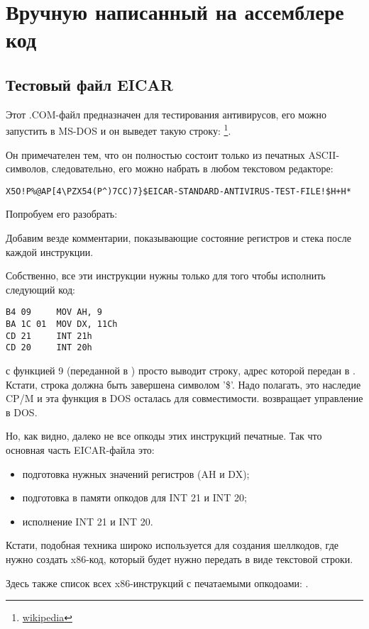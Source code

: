 \section{Вручную написанный на ассемблере код}

\subsection{Тестовый файл EICAR}
\label{subsec:EICAR}

Этот .COM-файл предназначен для тестирования антивирусов, его можно запустить в MS-DOS
и он выведет такую строку: 
\footnote{\href{http://go.yurichev.com/17005}{wikipedia}}.

Он примечателен тем, что он полностью состоит только из печатных ASCII-символов, следовательно, его можно
набрать в любом текстовом редакторе:

\begin{lstlisting}
X5O!P%@AP[4\PZX54(P^)7CC)7}$EICAR-STANDARD-ANTIVIRUS-TEST-FILE!$H+H*
\end{lstlisting}

Попробуем его разобрать:



Добавим везде комментарии, показывающие состояние регистров и стека после каждой инструкции.

Собственно, все эти инструкции нужны только для того чтобы исполнить следующий код:

\begin{lstlisting}
B4 09     MOV AH, 9
BA 1C 01  MOV DX, 11Ch
CD 21     INT 21h
CD 20     INT 20h
\end{lstlisting}

 с функцией 9 (переданной в ) просто выводит строку, адрес которой передан в .
Кстати, строка должна быть завершена символом '\$'.
Надо полагать, это наследие \gls{CP/M} 
и эта функция в DOS осталась для совместимости.
 возвращает управление в DOS.

Но, как видно, далеко не все опкоды этих инструкций печатные.
Так что основная часть EICAR-файла это:

\begin{itemize}
\item подготовка нужных значений регистров (AH и DX);
\item подготовка в памяти опкодов для INT 21 и INT 20;
\item исполнение INT 21 и INT 20.
\end{itemize}

Кстати, подобная техника широко используется для создания шеллкодов, 
где нужно создать x86-код, который будет нужно передать в виде текстовой строки.

Здесь также список всех x86-инструкций с печатаемыми опкодоами: .
